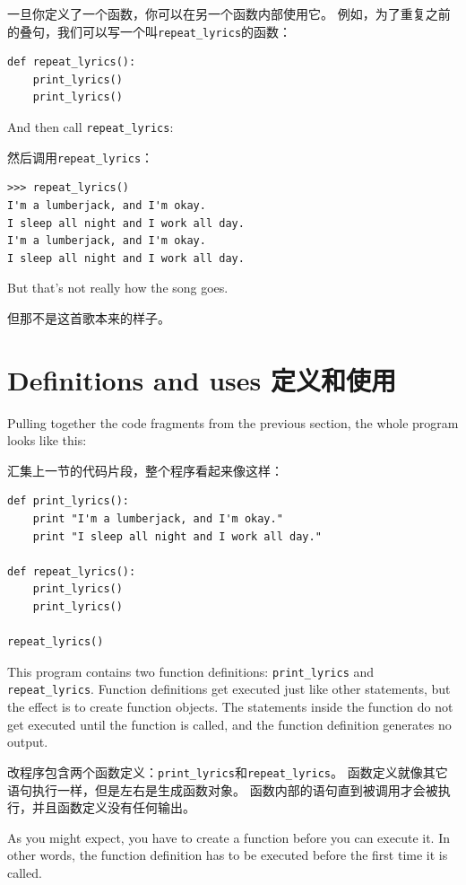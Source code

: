 \documentclass[10pt]{book}
\begin{document}
\begin{CJK}{UTF8}{gbsn}
一旦你定义了一个函数，你可以在另一个函数内部使用它。
例如，为了重复之前的叠句，我们可以写一个叫\verb"repeat_lyrics"的函数：

\begin{verbatim}
def repeat_lyrics():
    print_lyrics()
    print_lyrics()
\end{verbatim}
%
And then call \verb"repeat_lyrics":

然后调用\verb"repeat_lyrics"：

\begin{verbatim}
>>> repeat_lyrics()
I'm a lumberjack, and I'm okay.
I sleep all night and I work all day.
I'm a lumberjack, and I'm okay.
I sleep all night and I work all day.
\end{verbatim}
%
But that's not really how the song goes.

但那不是这首歌本来的样子。

\section{Definitions and uses 定义和使用}

Pulling together the code fragments from the previous section, the
whole program looks like this:

汇集上一节的代码片段，整个程序看起来像这样：

\begin{verbatim}
def print_lyrics():
    print "I'm a lumberjack, and I'm okay."
    print "I sleep all night and I work all day."

def repeat_lyrics():
    print_lyrics()
    print_lyrics()

repeat_lyrics()
\end{verbatim}
%
This program contains two function definitions: \verb"print_lyrics" and
\verb"repeat_lyrics".  Function definitions get executed just like other
statements, but the effect is to create function objects.  The statements
inside the function do not get executed until the function is called, and
the function definition generates no output.

改程序包含两个函数定义：\verb"print_lyrics"和\verb"repeat_lyrics"。
函数定义就像其它语句执行一样，但是左右是生成函数对象。
函数内部的语句直到被调用才会被执行，并且函数定义没有任何输出。

As you might expect, you have to create a function before you can
execute it.  In other words, the function definition has to be
executed before the first time it is called.


\end{CJK}
\end{document}
